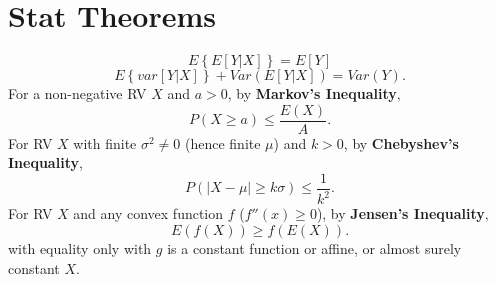 \section{Stat Theorems}
\[E \left\{ E \left[ Y|X \right] \right\}=E \left[ Y \right]\]
\[E\left\{ var\left[ Y|X \right]  \right\} + Var\left( E\left[ Y|X \right]  \right) =Var\left( Y \right).\] 
For a non-negative RV $X$ and $a>0$, by \textbf{Markov's Inequality},
\[P(X\ge a)\le \frac{E(X)}{A}.\]
For RV $X$ with finite $\sigma^{2}\neq 0$ (hence finite $\mu$) and $k>0$, by
\textbf{Chebyshev's Inequality},
\[P\left( \left| X-\mu \right| \ge k\sigma \right) \le \frac{1}{k^{2}}.\] 
For RV $X$ and any convex function $f$ ($f''(x)\ge 0$), by \textbf{Jensen's Inequality},
\[E(f(X))\ge f(E(X)).\] 
with equality only with $g$ is a constant function or affine, or almost surely constant $X$.\\
